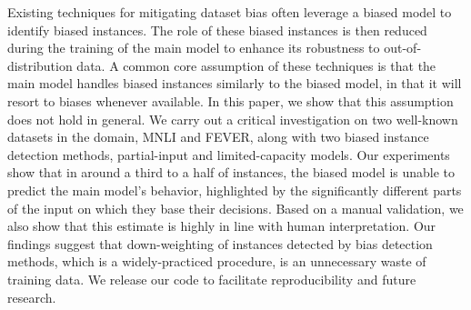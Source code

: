 Existing techniques for mitigating dataset bias often leverage a biased model to identify biased instances. The role of these biased instances is then reduced during the training of the main model to enhance its robustness to out-of-distribution data. A common core assumption of these techniques is that the main model handles biased instances similarly to the biased model, in that it will resort to biases whenever available. In this paper, we show that this assumption does not hold in general. We carry out a critical investigation on two well-known datasets in the domain, MNLI and FEVER, along with two biased instance detection methods, partial-input and limited-capacity models. Our experiments show that in around a third to a half of instances, the biased model is unable to predict the main model's behavior, highlighted by the significantly different parts of the input on which they base their decisions. Based on a manual validation, we also show that this estimate is highly in line with human interpretation. Our findings suggest that down-weighting of instances detected by bias detection methods, which is a widely-practiced procedure, is an unnecessary waste of training data. We release our code to facilitate reproducibility and future research.

